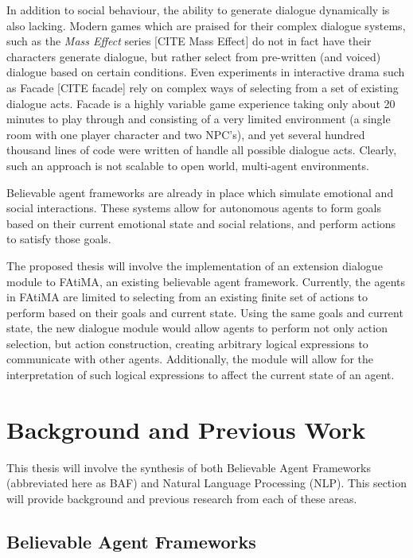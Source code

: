 \documentclass{article}
\begin{document}
In addition to social behaviour, the ability to generate dialogue
dynamically is also lacking.  Modern games which are praised for their
complex dialogue systems, such as the \emph{Mass Effect} series [CITE Mass
  Effect] do not in fact have their characters generate dialogue, but
rather select from pre-written (and voiced) dialogue based on certain
conditions.  Even experiments in interactive drama such as Facade
[CITE facade] rely on complex ways of selecting from a set of existing
dialogue acts.  Facade is a highly variable game experience taking
only about 20 minutes to play through and consisting of a very limited
environment (a single room with one player character and two NPC's), and
yet several hundred thousand lines of code were written of handle all
possible dialogue acts\cite{Mateas}.  Clearly, such an approach is not
scalable to open world, multi-agent environments.

Believable agent frameworks are already in place which simulate
emotional and social interactions.  These systems allow for autonomous
agents to form goals based on their current emotional state and social
relations, and perform actions to satisfy those goals.

The proposed thesis will involve the implementation of an extension dialogue module
to FAtiMA\cite{Mascarenhas}, an existing believable agent framework.
Currently, the agents in FAtiMA are limited to selecting from an
existing finite set of actions to perform based on their goals and
current state.  Using the same goals and current state, the new dialogue
module would allow agents to perform not only action selection, but
action construction, creating arbitrary logical expressions to
communicate with other agents.  Additionally, the module will allow for
the interpretation of such logical expressions to affect the current
state of an agent.

\section{Background and Previous Work}

This thesis will involve the synthesis of both Believable Agent
Frameworks (abbreviated here as BAF) and Natural Language Processing
(NLP).  This section will provide background and previous research
from each of these areas.

\subsection{Believable Agent Frameworks}
\end{document}
